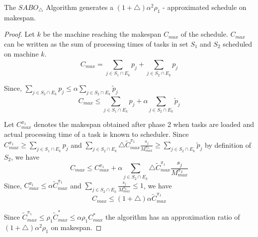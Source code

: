                           
                         
                         \begin{theorem}
                         \label{th:chapter5-2a}
                          The $SABO_\triangle$ Algorithm generates a $(1+\triangle)\alpha^2 \rho_1$ - approximated schedule on makespan.
                         \end{theorem}         
                         \begin{proof}
                         Let $k$ be the machine reaching the makespan $C_{max}$ of the schedule. $C_{max}$ can be written as the sum of processing times of tasks in set $S_1$ and $S_2$ scheduled on machine $k$.
                         \begin{equation}\nonumber
                   C_{max}= \sum_{j \in S_1 \cap E_k}^{}p_j+\sum_{j \in S_2 \cap E_k}^{}p_j 
                         \end{equation}
                         
                         Since, $\sum\limits
                         _{j \in S_2 \cap E_k}^{}p_j\leq\alpha\sum\limits
                         _{j \in S_2 \cap E_k} \tilde{p}_j$
                           \begin{equation}\nonumber
                           C_{max} \leq \sum_{j \in S_1 \cap E_k}^{}p_j+\alpha\sum_{j \in S_2 \cap E_k} \tilde{p}_j 
                                 \end{equation}
                        
                         
                         Let $C^{\pi_1}_{max}$ denotes the makespan obtained after phase 2 when tasks are loaded and actual processing time of a task is known to scheduler. Since $C^{\pi_1}_{max} \geq \sum\limits
                         _{j \in S_1 \cap E_k}^{}p_j$ and $\sum\limits
                         _{j \in S_2\cap E_k}\triangle {\tilde{C}^{\pi_1}_{max}} \frac{s_j}{M^{\pi_2}_{max}}\geq \sum\limits
                         _{j \in S_2\cap E_k}^{}\tilde{p}_j $ by definition of $S_2$, we have
         \begin{equation}\nonumber
     C_{max}\leq C^{\pi_1}_{max}+\alpha\sum_{j \in S_2\cap E_k}^{}\triangle {\tilde{C}^{\pi_1}_{max}} \frac{s_j}{M^{\pi_2}_{max}}
                                \end{equation}                    
       Since, $C^{\pi_1}_{max}\leq\alpha\tilde{C}^{\pi_1}_{max}$ and $\sum\limits_{j \in S_2\cap E_k} \frac{s_j}{M^{\pi_2}_{max}}\leq 1$, we have
         \begin{equation}\nonumber                       C_{max}\leq(1+\triangle)\alpha\tilde{C}^{\pi_1}_{max}                         \end{equation}
      
     Since $ \tilde{C}^{\pi_1}_{max} \leq \rho_1 \tilde{C}^{*}_{max}\leq \alpha\rho_1 {C}^{*}_{max}$ the algorithm has an approximation ratio of $(1+\triangle)\alpha^2 \rho_1$ on makespan.
                             \end{proof}
